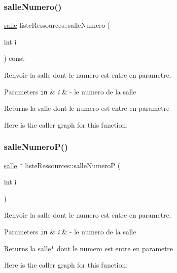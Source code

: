 \subsubsection{\texorpdfstring{salle\+Numero()}{salleNumero()}}
{\footnotesize\ttfamily \hyperlink{classsalle}{salle} liste\+Ressources\+::salle\+Numero (\begin{DoxyParamCaption}\item[{int}]{i }\end{DoxyParamCaption}) const}



Renvoie la salle dont le numero est entre en parametre. 


\begin{DoxyParams}[1]{Parameters}
\mbox{\tt in}  & {\em i} & -\/ le numero de la salle \\
\hline
\end{DoxyParams}
\begin{DoxyReturn}{Returns}
la salle dont le numero est entre en parametre 
\end{DoxyReturn}
Here is the caller graph for this function\+:
\hypertarget{classliste_ressources_a1badd55beb2e05645cc17d488fd0a3b9}{}\label{classliste_ressources_a1badd55beb2e05645cc17d488fd0a3b9} 
\subsubsection{\texorpdfstring{salle\+Numero\+P()}{salleNumeroP()}}
{\footnotesize\ttfamily \hyperlink{classsalle}{salle} $\ast$ liste\+Ressources\+::salle\+NumeroP (\begin{DoxyParamCaption}\item[{int}]{i }\end{DoxyParamCaption})}



Renvoie la salle dont le numero est entre en parametre. 


\begin{DoxyParams}[1]{Parameters}
\mbox{\tt in}  & {\em i} & -\/ le numero de la salle \\
\hline
\end{DoxyParams}
\begin{DoxyReturn}{Returns}
la salle$\ast$ dont le numero est entre en parametre 
\end{DoxyReturn}
Here is the caller graph for this function\+:
\hypertarget{classliste_ressources_a898637edf00749de0460b3ce07168a71}{}\label{classliste_ressources_a898637edf00749de0460b3ce07168a71} 
